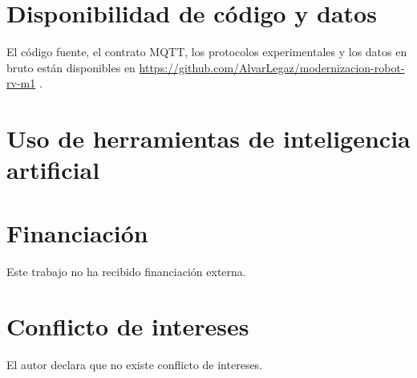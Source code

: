 \section*{Disponibilidad de código y datos}
El código fuente, el contrato MQTT, los protocolos experimentales y los datos en bruto están disponibles en \url{https://github.com/AlvarLegaz/modernizacion-robot-rv-m1} .

\section*{Uso de herramientas de inteligencia artificial}

\section*{Financiación}
Este trabajo no ha recibido financiación externa.

\section*{Conflicto de intereses}
El autor declara que no existe conflicto de intereses.
